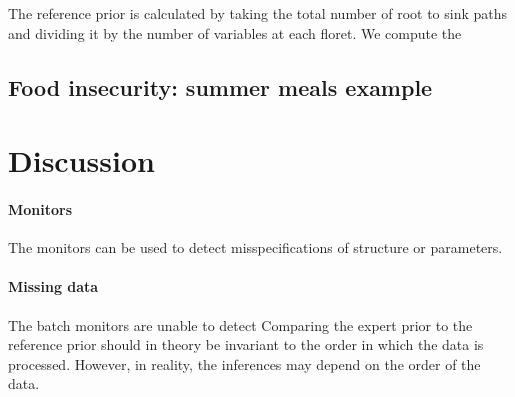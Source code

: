 \documentclass[12pt]{article}
\begin{document}
The reference prior is calculated by taking the total number of root to sink paths and dividing it by the number of variables at each floret. We compute the 


\subsection{Food insecurity: summer meals example} 

\section{Discussion}
 
\paragraph{Monitors}
The monitors can be used to detect misspecifications of structure or parameters. 

\paragraph{Missing data} The batch monitors are unable to detect 
Comparing the expert prior to the reference prior should in theory be invariant to the order in which the data is processed. However, in reality, the inferences may depend on the order of the data. 
\end{document}
